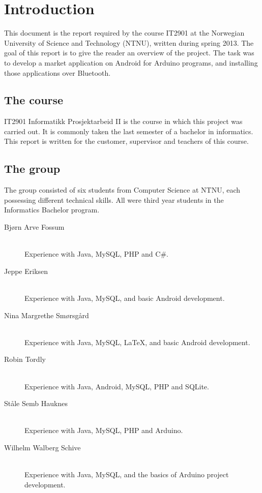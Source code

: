 \chapter{Introduction}

This document is the report required by the course IT2901 at the Norwegian University of Science and Technology (NTNU), written during spring 2013. The goal of this report is to give the reader an overview of the project.
The task was to develop a market application on Android for Arduino programs, and installing those applications over Bluetooth.

\section{The course}
IT2901 Informatikk Prosjektarbeid II is the course in which this project was carried out. It is commonly taken the last semester of a bachelor in informatics. This report is written for the customer, supervisor and teachers of this course.

\section{The group}
The group consisted of six students from Computer Science at NTNU, each possessing different technical skills. All were third year students in the Informatics Bachelor program.

\begin{description}
	\item[Bjørn Arve Fossum]\hfill \\
		Experience with Java, MySQL, PHP and C\#.
	\item[Jeppe Eriksen]\hfill \\
		Experience with Java, MySQL, and basic Android development.
	\item[Nina Margrethe Smørsgård]\hfill \\
		Experience with Java, MySQL, \LaTeX, and basic Android development.
	\item[Robin Tordly]\hfill \\
		Experience with Java, Android, MySQL, PHP and SQLite.
	\item[Ståle Semb Hauknes]\hfill \\
		Experience with Java, MySQL, PHP and Arduino.
	\item[Wilhelm Walberg Schive]\hfill \\
		Experience with Java, MySQL, and the basics of Arduino project development.
\end{description}

